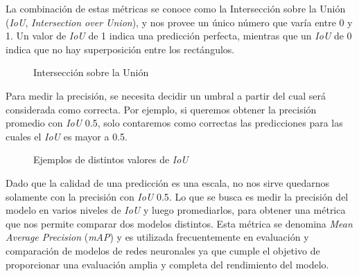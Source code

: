 \documentclass[a4paper]{article}
\begin{document}
La combinación de estas métricas se conoce como la Intersección sobre la Unión (\textit{IoU}, \textit{Intersection over Union}), y nos provee un único número que varía entre 0 y 1. Un valor de \textit{IoU} de 1 indica una predicción perfecta, mientras que un \textit{IoU} de 0 indica que no hay superposición entre los rectángulos.

\begin{figure}[H]
\caption{Intersección sobre la Unión}
\end{figure}

Para medir la precisión, se necesita decidir un umbral a partir del cual será considerada como correcta. Por ejemplo, si queremos obtener la precisión promedio con \textit{IoU} 0.5, solo contaremos como correctas las predicciones para las cuales el \textit{IoU} es mayor a 0.5.

\begin{figure}[H]
\caption{Ejemplos de distintos valores de \textit{IoU}}
\end{figure}

Dado que la calidad de una predicción es una escala, no nos sirve quedarnos solamente con la precisión con \textit{IoU} 0.5. Lo que se busca es medir la precisión del modelo en varios niveles de \textit{IoU} y luego promediarlos, para obtener una métrica que nos permite comparar dos modelos distintos. Esta métrica se denomina \textit{Mean Average Precision} (\textit{mAP}) y es utilizada frecuentemente en evaluación y comparación de modelos de redes neuronales ya que cumple el objetivo de proporcionar una evaluación amplia y completa del rendimiento del modelo.
\end{document}
